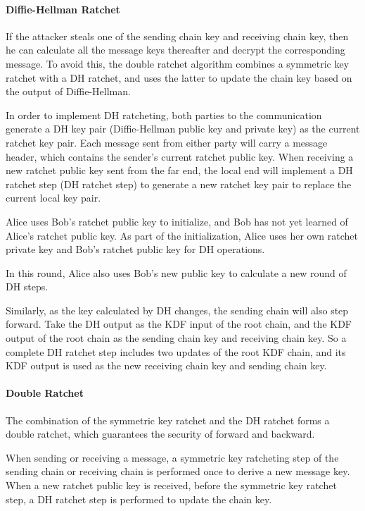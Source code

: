 \documentclass[11pt,en]{elegantpaper}
\begin{document}
\paragraph{Diffie-Hellman Ratchet}
If the attacker steals one of the sending chain key and receiving chain key, then he can calculate all the message keys thereafter and decrypt the corresponding message. To avoid this, the double ratchet algorithm combines a symmetric key ratchet with a DH ratchet, and uses the latter to update the chain key based on the output of Diffie-Hellman.

In order to implement DH ratcheting, both parties to the communication generate a DH key pair (Diffie-Hellman public key and private key) as the current ratchet key pair. Each message sent from either party will carry a message header, which contains the sender's current ratchet public key. When receiving a new ratchet public key sent from the far end, the local end will implement a DH ratchet step (DH ratchet step) to generate a new ratchet key pair to replace the current local key pair.

Alice uses Bob's ratchet public key to initialize, and Bob has not yet learned of Alice's ratchet public key. As part of the initialization, Alice uses her own ratchet private key and Bob's ratchet public key for DH operations.

In this round, Alice also uses Bob's new public key to calculate a new round of DH steps.

Similarly, as the key calculated by DH changes, the sending chain will also step forward. Take the DH output as the KDF input of the root chain, and the KDF output of the root chain as the sending chain key and receiving chain key. So a complete DH ratchet step includes two updates of the root KDF chain, and its KDF output is used as the new receiving chain key and sending chain key.

\paragraph{Double Ratchet}
The combination of the symmetric key ratchet and the DH ratchet forms a double ratchet, which guarantees the security of forward and backward.

When sending or receiving a message, a symmetric key ratcheting step of the sending chain or receiving chain is performed once to derive a new message key.
When a new ratchet public key is received, before the symmetric key ratchet step, a DH ratchet step is performed to update the chain key.
\end{document}
